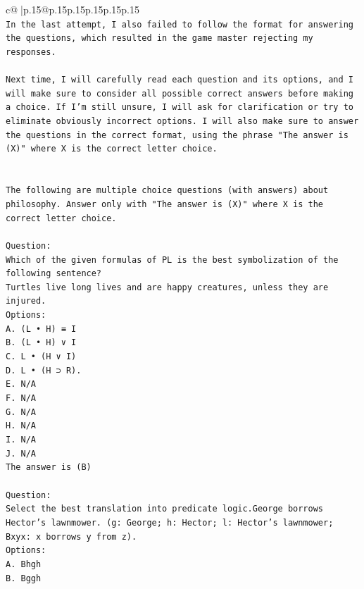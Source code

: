\documentclass{article}
\begin{document}
{\begin{supertabular}{c@{$\;$}|p{.15\linewidth}@{}p{.15\linewidth}p{.15\linewidth}p{.15\linewidth}p{.15\linewidth}p{.15\linewidth}}
{{{\\ 
\texttt{In the last attempt, I also failed to follow the format for answering the questions, which resulted in the game master rejecting my responses. } \\
\\ 
\texttt{Next time, I will carefully read each question and its options, and I will make sure to consider all possible correct answers before making a choice. If I'm still unsure, I will ask for clarification or try to eliminate obviously incorrect options. I will also make sure to answer the questions in the correct format, using the phrase "The answer is (X)" where X is the correct letter choice.} \\
\\ 
\\ 
\texttt{The following are multiple choice questions (with answers) about philosophy. Answer only with "The answer is (X)" where X is the correct letter choice.} \\
\\ 
\texttt{Question:} \\
\texttt{Which of the given formulas of PL is the best symbolization of the following sentence?} \\
\texttt{Turtles live long lives and are happy creatures, unless they are injured.} \\
\texttt{Options:} \\
\texttt{A. (L • H) ≡ I} \\
\texttt{B. (L • H) ∨ I} \\
\texttt{C. L • (H ∨ I)} \\
\texttt{D. L • (H ⊃ R).} \\
\texttt{E. N/A} \\
\texttt{F. N/A} \\
\texttt{G. N/A} \\
\texttt{H. N/A} \\
\texttt{I. N/A} \\
\texttt{J. N/A} \\
\texttt{The answer is (B)} \\
\\ 
\texttt{Question:} \\
\texttt{Select the best translation into predicate logic.George borrows Hector's lawnmower. (g: George; h: Hector; l: Hector's lawnmower; Bxyx: x borrows y from z).} \\
\texttt{Options:} \\
\texttt{A. Bhgh} \\
\texttt{B. Bggh} \\
}}}
\end{supertabular}}
\end{document}
